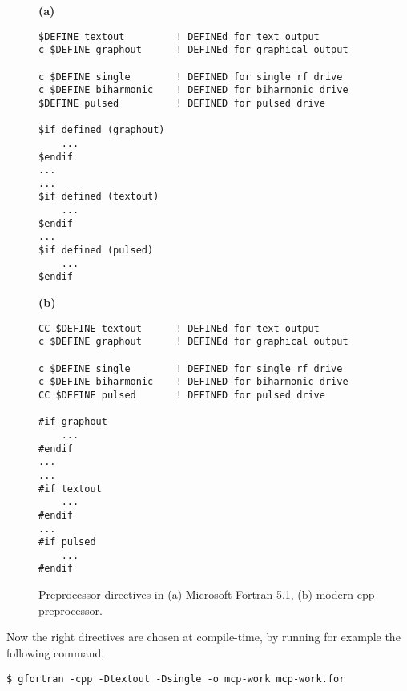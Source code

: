 \begin{figure}[b]
\centering

\begin{minipage}{0.48\textwidth}
\textbf{(a)}
\begin{lstlisting}
$DEFINE textout			! DEFINEd for text output
c $DEFINE graphout		! DEFINEd for graphical output

c $DEFINE single        ! DEFINED for single rf drive
c $DEFINE biharmonic    ! DEFINED for biharmonic drive
$DEFINE pulsed			! DEFINED for pulsed drive

$if defined (graphout)
	...
$endif
...
...
$if defined (textout)
	...
$endif
...
$if defined (pulsed)
	...
$endif
\end{lstlisting}
\end{minipage}
%
\hfill
%
\begin{minipage}{0.48\textwidth}
\textbf{(b)}
\begin{lstlisting}
CC $DEFINE textout		! DEFINEd for text output
c $DEFINE graphout		! DEFINEd for graphical output

c $DEFINE single        ! DEFINED for single rf drive
c $DEFINE biharmonic    ! DEFINED for biharmonic drive
CC $DEFINE pulsed		! DEFINED for pulsed drive

#if graphout
	...
#endif
...
...
#if textout
	...
#endif
...
#if pulsed
	...
#endif
\end{lstlisting}
\end{minipage}

\caption{Preprocessor directives in (a) Microsoft Fortran 5.1, (b) modern \textsf{cpp} preprocessor.}
\label{fig:preprocessor}
\end{figure}


Now the right directives are chosen at compile-time, by running for example the following command,

\begin{lstlisting}
$ gfortran -cpp -Dtextout -Dsingle -o mcp-work mcp-work.for
\end{lstlisting}

